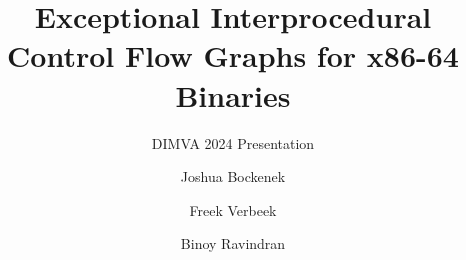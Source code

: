 \title[EICFGs for x86-64 Binaries]{Exceptional Interprocedural Control Flow Graphs
for x86-64 Binaries}
\subtitle{DIMVA 2024 Presentation}
\author[J.\ Bockenek et al.]{Joshua Bockenek \and Freek Verbeek \and Binoy Ravindran}
\subject{Static Binary Analysis}
\date{}
